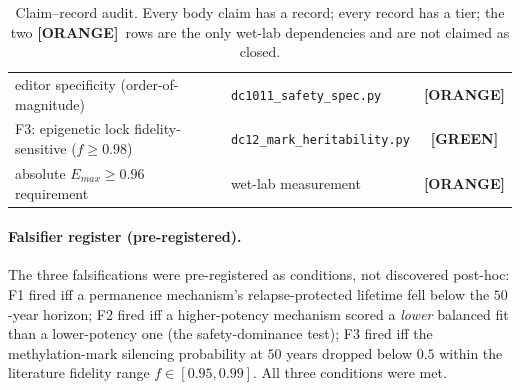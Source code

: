 \documentclass[11pt,a4paper]{article}
\newcommand{\tierbadge}[2]{\textcolor{#1}{\textbf{[#2]}}}
\providecommand{\tierGreen}{\tierbadge{green!45!black}{GREEN}}
\providecommand{\tierOrange}{\tierbadge{orange!80!black}{ORANGE}}
\begin{document}
\begin{table}[h]
\begin{tabular}{@{}>{\raggedright\arraybackslash}m{6.6cm} >{\raggedright\arraybackslash}m{4.4cm} c@{}}
editor specificity (order-of-magnitude)                         & \texttt{dc1011\_safety\_spec.py}& \tierOrange \\
F3: epigenetic lock fidelity-sensitive ($f\geq 0.98$)          & \texttt{dc12\_mark\_heritability.py} & \tierGreen \\
absolute $E_{max}\geq 0.96$ requirement                         & wet-lab measurement             & \tierOrange \\
\bottomrule
\end{tabular}
\caption{Claim--record audit. Every body claim has a record; every record has a
tier; the two \tierOrange\ rows are the only wet-lab dependencies and are not
claimed as closed.}
\label{tab:audit}
\end{table}

\paragraph{Falsifier register (pre-registered).} The three falsifications were
pre-registered as conditions, not discovered post-hoc: F1 fired iff a permanence
mechanism's relapse-protected lifetime fell below the $50$-year horizon; F2 fired
iff a higher-potency mechanism scored a \emph{lower} balanced fit than a
lower-potency one (the safety-dominance test); F3 fired iff the methylation-mark
silencing probability at $50$ years dropped below $0.5$ within the literature
fidelity range $f\in[0.95,0.99]$. All three conditions were met.



\end{document}
